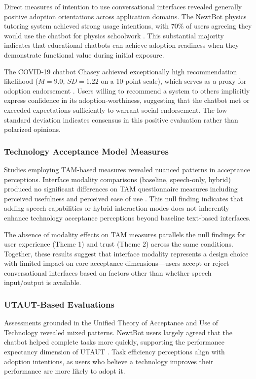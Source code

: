 \documentclass[manuscript,anonymous,sigconf]{acmart}
\begin{document}
Direct measures of intention to use conversational interfaces revealed generally positive adoption orientations across application domains. The NewtBot physics tutoring system achieved strong usage intentions, with 70\% of users agreeing they would use the chatbot for physics schoolwork \cite{A22}. This substantial majority indicates that educational chatbots can achieve adoption readiness when they demonstrate functional value during initial exposure.

The COVID-19 chatbot Chasey achieved exceptionally high recommendation likelihood ($M = 9.0$, $SD = 1.22$ on a 10-point scale), which serves as a proxy for adoption endorsement \cite{A79}. Users willing to recommend a system to others implicitly express confidence in its adoption-worthiness, suggesting that the chatbot met or exceeded expectations sufficiently to warrant social endorsement. The low standard deviation indicates consensus in this positive evaluation rather than polarized opinions.

\subsubsection{Technology Acceptance Model Measures}

Studies employing TAM-based measures revealed nuanced patterns in acceptance perceptions. Interface modality comparisons (baseline, speech-only, hybrid) produced no significant differences on TAM questionnaire measures including perceived usefulness and perceived ease of use \cite{A15}. This null finding indicates that adding speech capabilities or hybrid interaction modes does not inherently enhance technology acceptance perceptions beyond baseline text-based interfaces.

The absence of modality effects on TAM measures parallels the null findings for user experience (Theme 1) and trust (Theme 2) across the same conditions. Together, these results suggest that interface modality represents a design choice with limited impact on core acceptance dimensions---users accept or reject conversational interfaces based on factors other than whether speech input/output is available.

\subsubsection{UTAUT-Based Evaluations}

Assessments grounded in the Unified Theory of Acceptance and Use of Technology revealed mixed patterns. NewtBot users largely agreed that the chatbot helped complete tasks more quickly, supporting the performance expectancy dimension of UTAUT \cite{A22}. Task efficiency perceptions align with adoption intentions, as users who believe a technology improves their performance are more likely to adopt it.
\end{document}
